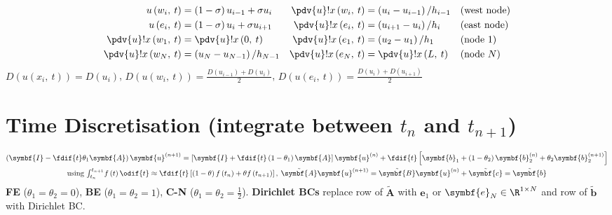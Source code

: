 \documentclass{article}
\begin{document}
\begin{minipage}[t]{126.1962963mm}
    \begin{align*}
        u\left( w_i,\: t \right)           & = \left( 1 - \sigma \right) u_{i-1} + \sigma u_i & \pdv{u}!{x}\left( w_i,\: t \right) & = \left( u_i - u_{i-1} \right) / h_{i-1} &  & \text{(west node)}  \\
        u\left( e_i,\: t \right)           & = \left( 1 - \sigma \right) u_i + \sigma u_{i+1} & \pdv{u}!{x}\left( e_i,\: t \right) & = \left( u_{i+1} - u_i \right) / h_i     &  & \text{(east node)}  \\
        \pdv{u}!{x}\left( w_1,\: t \right) & = \pdv{u}!{x}\left( 0,\: t \right)               & \pdv{u}!{x}\left( e_1,\: t \right) & = \left( u_2 - u_1 \right) / h_1         &  & \text{(node 1)}     \\
        \pdv{u}!{x}\left( w_N,\: t \right) & = \left( u_N - u_{N-1} \right) / h_{N-1}         & \pdv{u}!{x}\left( e_N,\: t \right) & = \pdv{u}!{x}\left( L,\: t \right)       &  & \text{(node \(N\))}
    \end{align*}
    \(D\left( u\left( x_i,\: t \right) \right) = D\left( u_i \right)\),
    \(D\left( u\left( w_i,\: t \right) \right) = \frac{D\left( u_{i-1} \right) + D\left( u_i \right)}{2}\),
    \(D\left( u\left( e_i,\: t \right) \right) = \frac{D\left( u_i \right) + D\left( u_{i+1} \right)}{2}\)
    \section{Time Discretisation (integrate between \texorpdfstring{\(t_n\)}{tn} and \texorpdfstring{\(t_{n+1}\)}{tn+1})}
    \begin{gather*}
        \left( \symbf{I} - \fdif{t} \theta_1 \symbf{A} \right) \symbf{u}^{\left( n+1 \right)} = \left[ \symbf{I} + \fdif{t} \left( 1 - \theta_1 \right) \symbf{A} \right] \symbf{u}^{\left( n \right)} + \fdif{t} \left[ \symbf{b}_1 + \left( 1 - \theta_2 \right) \symbf{b}_2^{\left( n \right)} + \theta_2 \symbf{b}_2^{\left( n+1 \right)} \right] \\
        \text{using } {\textstyle\int_{t_n}^{t_{n+1}}} f\left( t \right) \odif{t} \approx \fdif{t} \left[ \left( 1 - \theta \right) f\left( t_n \right) + \theta f\left( t_{n+1} \right) \right],\: \tilde{\symbf{A}} \symbf{u}^{\left( n+1 \right)} = \tilde{\symbf{B}} \symbf{u}^{\left( n \right)} + \tilde{\symbf{c}} = \tilde{\symbf{b}}
    \end{gather*}
    \textbf{FE} (\(\theta_1 = \theta_2 = 0\)), \textbf{BE} (\(\theta_1 = \theta_2 = 1\)), \textbf{C-N} (\(\theta_1 = \theta_2 = \frac{1}{2}\)).
    \textbf{Dirichlet BCs} replace row of \(\tilde{\symbf{A}}\) with
    \(\symbf{e}_1\) or \(\symbf{e}_N \in \R^{1 \times N}\) and row of
    \(\tilde{\symbf{b}}\) with Dirichlet BC.

\end{minipage}
\end{document}

